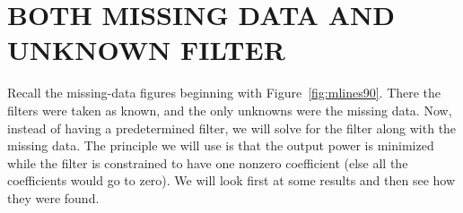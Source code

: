 %





\section{BOTH MISSING DATA AND UNKNOWN FILTER}
Recall the missing-data figures beginning with Figure~\ref{fig:mlines90}.
There the filters were taken as known,
and the only unknowns were the missing data.
Now, instead of having a predetermined filter,
we will solve for the filter along with the missing data.
The principle we will use is that the output power is minimized
while the filter is constrained to have one nonzero coefficient
(else all the coefficients would go to zero).
We will look first at some results and then see how they were found.

